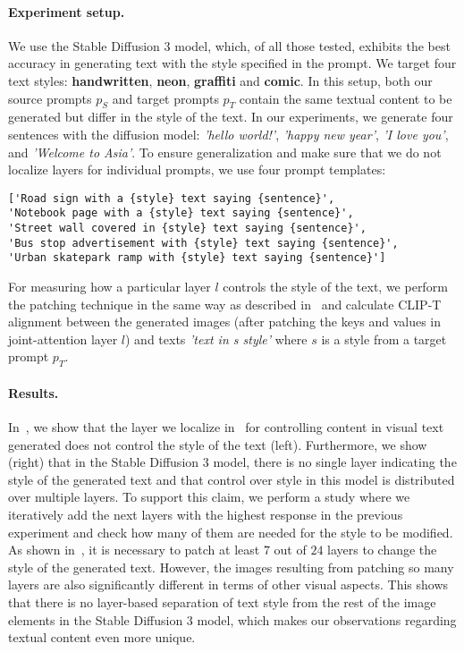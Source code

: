 \paragraph{Experiment setup.} We use the Stable Diffusion 3 model, which, of all those tested, exhibits the best accuracy in generating text with the style specified in the prompt. We target four text styles: \textbf{handwritten}, \textbf{neon}, \textbf{graffiti} and \textbf{comic}. In this setup, both our source prompts $p_{S}$ and target prompts $p_{T}$ contain the same textual content to be generated but differ in the style of the text. In our experiments, we generate four sentences with the diffusion model: \textit{'hello world!'}, \textit{'happy new year'}, \textit{'I love you'}, and \textit{'Welcome to Asia'}. To ensure generalization and make sure that we do not localize layers for individual prompts, we use four prompt templates:~\begin{verbatim}
['Road sign with a {style} text saying {sentence}', 
'Notebook page with a {style} text saying {sentence}', 
'Street wall covered in {style} text saying {sentence}',
'Bus stop advertisement with {style} text saying {sentence}',
'Urban skatepark ramp with {style} text saying {sentence}']
\end{verbatim}

For measuring how a particular layer $l$ controls the style of the text, we perform the patching technique in the same way as described in~ and calculate CLIP-T alignment between the generated images (after patching the keys and values in joint-attention layer $l$) and texts \textit{'text in {s} style'} where $s$ is a style from a target prompt $p_T$.

\paragraph{Results.} In~, we show that the layer we localize in~ for controlling content in visual text generated does not control the style of the text (left). Furthermore, we show (right) that in the Stable Diffusion 3 model, there is no single layer indicating the style of the generated text and that control over style in this model is distributed over multiple layers. To support this claim, we perform a study where we iteratively add the next layers with the highest response in the previous experiment and check how many of them are needed for the style to be modified. As shown in~, it is necessary to patch at least $7$ out of $24$ layers to change the style of the generated text. However, the images resulting from patching so many layers are also significantly different in terms of other visual aspects. %
This shows that there is no layer-based separation of text style from the rest of the image elements in the Stable Diffusion 3 model, which makes our observations regarding textual content even more unique.

